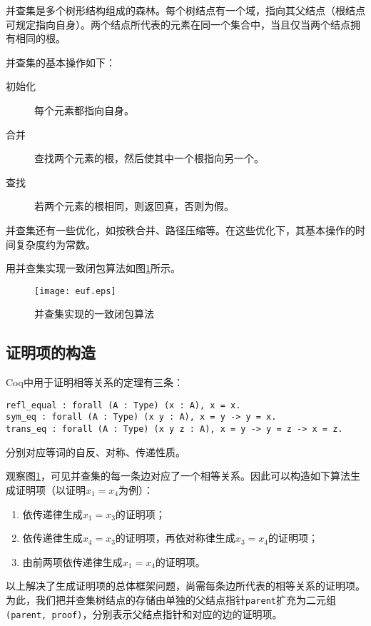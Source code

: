 并查集是多个树形结构组成的森林。每个树结点有一个域，指向其父结点（根结点可规定指向自身）。两个结点所代表的元素在同一个集合中，当且仅当两个结点拥有相同的根。

并查集的基本操作如下：
\begin{description}
  \item[初始化] 每个元素都指向自身。
  \item[合并] 查找两个元素的根，然后使其中一个根指向另一个。
  \item[查找] 若两个元素的根相同，则返回真，否则为假。
\end{description}

并查集还有一些优化，如按秩合并、路径压缩等。在这些优化下，其基本操作的时间复杂度约为常数。

用并查集实现一致闭包算法如图\ref{euf:set}所示。
\begin{figure}[!htbp]
  \centering
  \texttt{[image: euf.eps]}
  \caption{并查集实现的一致闭包算法}
  \label{euf:set}
\end{figure}

\subsection{证明项的构造}
Coq中用于证明相等关系的定理有三条：
\begin{verbatim}
refl_equal : forall (A : Type) (x : A), x = x.
sym_eq : forall (A : Type) (x y : A), x = y -> y = x.
trans_eq : forall (A : Type) (x y z : A), x = y -> y = z -> x = z.
\end{verbatim}
分别对应等词的自反、对称、传递性质。

观察图\ref{euf:set}，可见并查集的每一条边对应了一个相等关系。因此可以构造如下算法生成证明项（以证明$x_1=x_4$为例）：
\begin{enumerate}
  \item 依传递律生成$x_1=x_3$的证明项；
  \item 依传递律生成$x_4=x_3$的证明项，再依对称律生成$x_3=x_4$的证明项；
  \item 由前两项依传递律生成$x_1=x_4$的证明项。
\end{enumerate}

以上解决了生成证明项的总体框架问题，尚需每条边所代表的相等关系的证明项。为此，我们把并查集树结点的存储由单独的父结点指针\texttt{parent}扩充为二元组\texttt{(parent, proof)}，分别表示父结点指针和对应的边的证明项。

